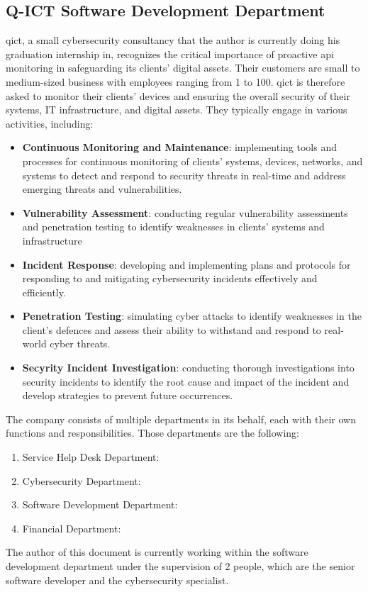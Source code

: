 \begin{multicols}{2}
    \section{Q-ICT Software Development Department}
    \acrshort{qict}, a small cybersecurity consultancy that the author is currently doing his graduation
    internship in, recognizes the critical importance of proactive \acrshort{api} monitoring in safeguarding its clients' digital
    assets. Their customers are small to medium-sized business with employees ranging from 1 to 100. \acrshort{qict} is
    therefore asked to monitor their clients' devices and ensuring the overall security of their systems, IT
    infrastructure, and digital assets. They typically engage in various activities, including:
    \begin{itemize}
        \item \textbf{Continuous Monitoring and Maintenance}: implementing tools and processes for continuous monitoring of
              clients' systems, devices, networks, and systems to detect and respond to security threats in
              real-time and address emerging threats and vulnerabilities.
        \item \textbf{Vulnerability Assessment}: conducting regular vulnerability assessments and penetration
              testing to identify weaknesses in clients' systems and infrastructure
        \item \textbf{Incident Response}: developing and implementing plans and protocols for responding to
              and mitigating cybersecurity incidents effectively and efficiently.
        \item \textbf{Penetration Testing}: simulating cyber attacks to identify weaknesses in the client's defences and
              assess their ability to withstand and respond to real-world cyber threats.
        \item \textbf{Secyrity Incident Investigation}: conducting thorough investigations into security incidents to
              identify the root cause and impact of the incident and develop strategies to prevent future occurrences.
    \end{itemize}
    The company consists of multiple departments in its behalf, each with their own functions and responsibilities.
    Those departments are the following:
    \begin{enumerate}
        \item Service Help Desk Department:
        \item Cybersecurity Department:
        \item Software Development Department:
        \item Financial Department:
    \end{enumerate}
    The author of this document is currently working within the software development department under the supervision of
    2 people, which are the senior software developer and the cybersecurity specialist.


\end{multicols}
